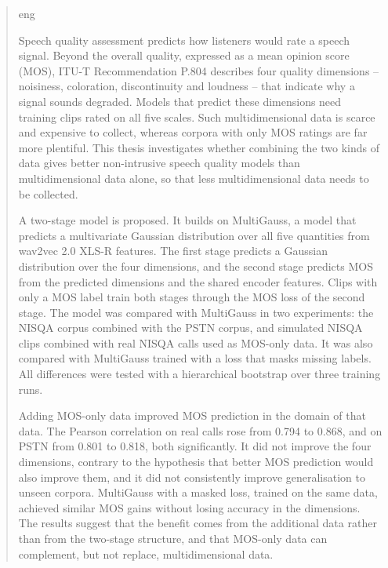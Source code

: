 \documentclass[
english,                 %
bibtex,                  %
includeExtraAbstracts, %
]{kththesis}
\numberwithin{listing}{chapter}
\begin{document}
\begin{abstract}
  \markboth{\abstractname}{}
\begin{scontents}[store-env=lang]
eng
\end{scontents}
\begin{scontents}[store-env=abstracts,print-env=true]
Speech quality assessment predicts how listeners would rate a speech signal. Beyond the overall quality, expressed as a mean opinion score (MOS), ITU-T Recommendation P.804 describes four quality dimensions -- noisiness, coloration, discontinuity and loudness -- that indicate why a signal sounds degraded. Models that predict these dimensions need training clips rated on all five scales. Such multidimensional data is scarce and expensive to collect, whereas corpora with only MOS ratings are far more plentiful. This thesis investigates whether combining the two kinds of data gives better non-intrusive speech quality models than multidimensional data alone, so that less multidimensional data needs to be collected.

A two-stage model is proposed. It builds on MultiGauss, a model that predicts a multivariate Gaussian distribution over all five quantities from wav2vec 2.0 XLS-R features. The first stage predicts a Gaussian distribution over the four dimensions, and the second stage predicts MOS from the predicted dimensions and the shared encoder features. Clips with only a MOS label train both stages through the MOS loss of the second stage. The model was compared with MultiGauss in two experiments: the NISQA corpus combined with the PSTN corpus, and simulated NISQA clips combined with real NISQA calls used as MOS-only data. It was also compared with MultiGauss trained with a loss that masks missing labels. All differences were tested with a hierarchical bootstrap over three training runs.

Adding MOS-only data improved MOS prediction in the domain of that data. The Pearson correlation on real calls rose from 0.794 to 0.868, and on PSTN from 0.801 to 0.818, both significantly. It did not improve the four dimensions, contrary to the hypothesis that better MOS prediction would also improve them, and it did not consistently improve generalisation to unseen corpora. MultiGauss with a masked loss, trained on the same data, achieved similar MOS gains without losing accuracy in the dimensions. The results suggest that the benefit comes from the additional data rather than from the two-stage structure, and that MOS-only data can complement, but not replace, multidimensional data.
\end{scontents}


\end{abstract}
\end{document}
